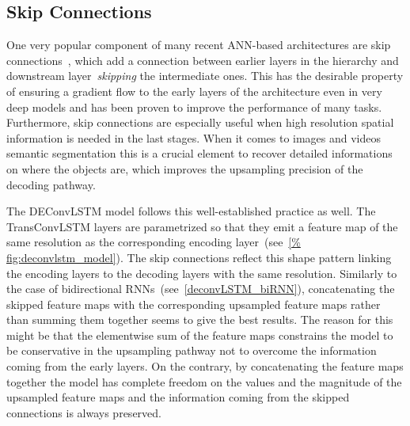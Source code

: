 \subsection{Skip Connections}\label{sec:deconvLSTM_skip_connections}
One very popular component of many recent ANN-based architectures are skip
connections~\citep[see e.g.,~][]{sermanet-cvpr-13,liu2015parsenet,
long2015fully,Srivastava-et-al-arxiv2015,bell2015inside,he2015deep,
hariharan2015hypercolumns}, which add a connection between earlier layers in
the hierarchy and downstream layer~\emph{skipping} the intermediate ones. This
has the desirable property of ensuring a gradient flow to the early layers of
the architecture even in very deep models and has been proven to improve the
performance of many tasks. Furthermore, skip connections are especially useful
when high resolution spatial information is needed in the last stages. When it
comes to images and videos semantic segmentation this is a crucial element to
recover detailed informations on where the objects are, which improves the
upsampling precision of the decoding pathway.

The DEConvLSTM model follows this well-established practice as well. The
TransConvLSTM layers are parametrized so that they emit a feature map of the
same resolution as the corresponding encoding layer~(see~\autoref{%
fig:deconvlstm_model}). The skip connections reflect this shape pattern linking
the encoding layers to the decoding layers with the same resolution. Similarly
to the case of bidirectional RNNs~(see~\autoref{deconvLSTM_biRNN}),
concatenating the skipped feature maps with the corresponding upsampled feature
maps rather than summing them together seems to give the best results. The
reason for this might be that the elementwise sum of the feature maps
constrains the model to be conservative in the upsampling pathway not to
overcome the information coming from the early layers. On the contrary, by
concatenating the feature maps together the model has complete freedom on the
values and the magnitude of the upsampled feature maps and the information
coming from the skipped connections is always preserved.


